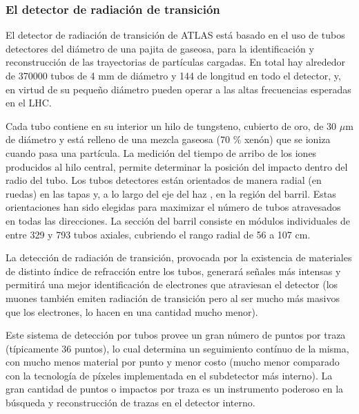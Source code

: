 \subsubsection{El detector de radiaci\'on de transici\'on}

 
  El detector de radiaci\'on de transici\'on de ATLAS est\'a basado en el uso de tubos detectores del di\'ametro de una pajita de gaseosa, para la identificaci\'on y reconstrucci\'on de las trayectorias de part\'iculas cargadas. En total hay alrededor de 370000 tubos de 4 mm de di\'ametro y 144 de longitud en todo el detector, y, en virtud de su peque\~no di\'ametro pueden operar a las altas frecuencias esperadas en el LHC. %
   
  Cada tubo contiene en su interior un hilo de tungsteno, cubierto de oro, de 30 $\mu$m de di\'ametro y est\'a relleno de una mezcla gaseosa (70 $\%$ xen\'on) que se ioniza cuando pasa una part\'icula. La medici\'on del tiempo de arribo de los iones producidos al hilo central, permite determinar la posici\'on del impacto dentro del radio del tubo. %
  Los tubos detectores est\'an orientados de manera radial (en ruedas) en las tapas y, a lo largo del eje del haz , en la regi\'on del barril. Estas orientaciones han sido elegidas para maximizar el n\'umero de tubos atravesados en todas las direcciones.  La secci\'on del barril consiste en m\'odulos individuales de entre 329 y 793 tubos axiales, cubriendo el rango radial de 56 a 107 cm.  

   La detecci\'on de radiaci\'on de transici\'on, provocada por la existencia de materiales de distinto \'indice de refracci\'on entre los tubos, generar\'a se\~nales m\'as intensas y permitir\'a una mejor identificaci\'on de electrones que atraviesan el detector (los muones tambi\'en emiten radiaci\'on de transici\'on pero al ser mucho m\'as masivos que los electrones, lo hacen en una cantidad mucho menor).

   Este sistema de detecci\'on por tubos provee un gran n\'umero de puntos por traza (t\'ipicamente 36 puntos), lo cual determina un seguimiento cont\'inuo de la misma, con mucho menos material por punto y menor costo (mucho menor comparado con la tecnolog\'ia de p\'ixeles implementada en el subdetector m\'as interno).  La gran cantidad de puntos o impactos por traza es un instrumento poderoso en la b\'usqueda y reconstrucci\'on de trazas en el detector interno.

